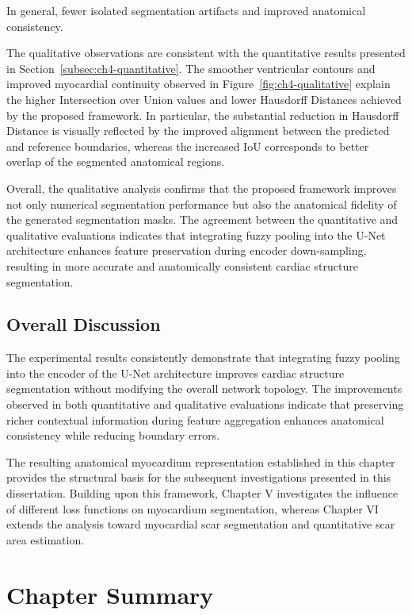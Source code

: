 In general, fewer isolated segmentation artifacts and improved anatomical consistency.

The qualitative observations are consistent with the quantitative results presented in Section~\ref{subsec:ch4-quantitative}. The smoother ventricular contours and improved myocardial continuity observed in Figure~\ref{fig:ch4-qualitative} explain the higher Intersection over Union values and lower Hausdorff Distances achieved by the proposed framework. In particular, the substantial reduction in Hausdorff Distance is visually reflected by the improved alignment between the predicted and reference boundaries, whereas the increased IoU corresponds to better overlap of the segmented anatomical regions.

Overall, the qualitative analysis confirms that the proposed framework improves not only numerical segmentation performance but also the anatomical fidelity of the generated segmentation masks. The agreement between the quantitative and qualitative evaluations indicates that integrating fuzzy pooling into the U-Net architecture enhances feature preservation during encoder down-sampling, resulting in more accurate and anatomically consistent cardiac structure segmentation.

\subsection{Overall Discussion}
\label{subsec:ch4-discussion}

The experimental results consistently demonstrate that integrating fuzzy pooling into the encoder of the U-Net architecture improves cardiac structure segmentation without modifying the overall network topology. The improvements observed in both quantitative and qualitative evaluations indicate that preserving richer contextual information during feature aggregation enhances anatomical consistency while reducing boundary errors.

The resulting anatomical myocardium representation established in this chapter provides the structural basis for the subsequent investigations presented in this dissertation. Building upon this framework, Chapter V investigates the influence of different loss functions on myocardium segmentation, whereas Chapter VI extends the analysis toward myocardial scar segmentation and quantitative scar area estimation.

\section{Chapter Summary}
\label{sec:ch4-summary}

